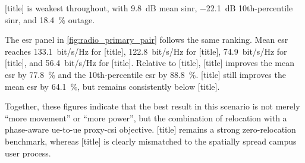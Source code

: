 [title] is weakest throughout, with \SI{9.8}{dB} mean \gls{sinr}, \SI{-22.1}{dB} \num{10}th-percentile \gls{sinr}, and \SI{18.4}{\percent} outage.

The \gls{esr} panel in \cref{fig:radio_primary_pair} follows the same ranking. Mean \gls{esr} reaches \SI{133.1}{bit/s/Hz} for [title], \SI{122.8}{bit/s/Hz} for [title], \SI{74.9}{bit/s/Hz} for [title], and \SI{56.4}{bit/s/Hz} for [title]. Relative to [title], [title] improves the mean \gls{esr} by \SI{77.8}{\percent} and the \num{10}th-percentile \gls{esr} by \SI{88.8}{\percent}. [title] still improves the mean \gls{esr} by \SI{64.1}{\percent}, but remains consistently below [title].

Together, these figures indicate that the best result in this scenario is not merely ``more movement'' or ``more power'', but the combination of relocation with a phase-aware \gls{ue}-to-\gls{ue} proxy-\gls{csi} objective. [title] remains a strong zero-relocation benchmark, whereas [title] is clearly mismatched to the spatially spread campus user process.
